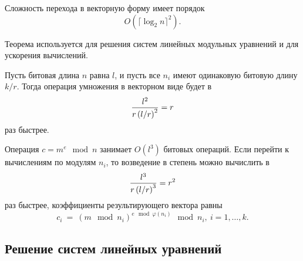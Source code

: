 Сложность перехода в векторную форму имеет порядок
        \[ O( \lceil \log_2 n \rceil ^2). \]

Теорема используется для решения систем линейных модульных уравнений и для ускорения вычислений.

Пусть битовая длина $n$ равна $l$, и пусть все $n_i$ имеют одинаковую битовую длину $k / r$. Тогда операция умножения в векторном виде будет в
    \[ \frac{l^2}{r \left( l \middle/ r \right)^2 } = r \]
раз быстрее.

Операция $c = m^e \mod n$ занимает $O(l^3)$ битовых операций. Если перейти к вычислениям по модулям $n_i$, то возведение в степень можно вычислить в
    \[ \frac{l^3}{r \left( l \middle/ r \right)^3 } = r^2 \]
раз быстрее, коэффициенты результирующего вектора равны
    \[ c_i ~=~ \left( m \mod n_i \right)^{e \mod \varphi(n_i)} \mod n_i, ~ i = 1, \dots, k. \]

\subsection{Решение систем линейных уравнений}

